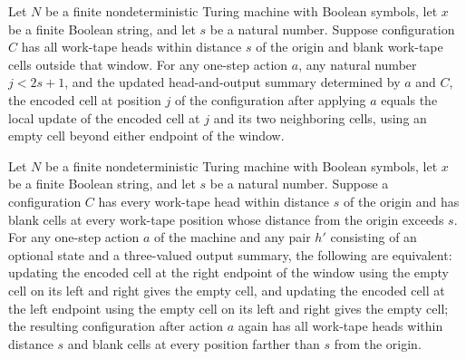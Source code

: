 \begin{theorem}
\label{Complexity.Codec.cellOf_apply}
\leanok
{}
Let $N$ be a finite nondeterministic Turing machine with Boolean symbols, let $x$ be a
finite Boolean string, and let $s$ be a natural number. Suppose configuration $C$ has
all work-tape heads within distance $s$ of the origin and blank work-tape cells outside
that window. For any one-step action $a$, any natural number $j<2s+1$, and the updated
head-and-output summary determined by $a$ and $C$, the encoded cell at position $j$ of
the configuration after applying $a$ equals the local update of the encoded cell at $j$
and its two neighboring cells, using an empty cell beyond either endpoint of the window.
\end{theorem}

\begin{theorem}
\label{Complexity.Codec.boundary_iff}
\leanok
{}
Let $N$ be a finite nondeterministic Turing machine with Boolean symbols, let $x$ be a
finite Boolean string, and let $s$ be a natural number. Suppose a configuration $C$ has
every work-tape head within distance $s$ of the origin and has blank cells at every
work-tape position whose distance from the origin exceeds $s$. For any one-step action
$a$ of the machine and any pair $h'$ consisting of an optional state and a three-valued
output summary, the following are equivalent: updating the encoded cell at the right
endpoint of the window using the empty cell on its left and right gives the empty cell,
and updating the encoded cell at the left endpoint using the empty cell on its left and
right gives the empty cell; the resulting configuration after action $a$ again has all
work-tape heads within distance $s$ and blank cells at every position farther than $s$
from the origin.
\end{theorem}

